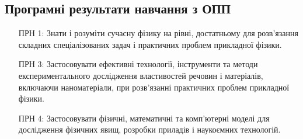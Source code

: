 \documentclass{Syllabus}
\begin{document}
\subsection*{Програмні результати навчання з ОПП}

\begin{enumerate}
	\item [ПРН 1:] Знати і розуміти сучасну фізику на рівні, достатньому для розв’язання складних спеціалізованих задач і практичних проблем прикладної фізики.
	\item [ПРН 3:] Застосовувати ефективні технології, інструменти та методи експериментального дослідження властивостей речовин і матеріалів, включаючи наноматеріали, при розв’язанні практичних проблем прикладної фізики.
	\item [ПРН 4:] Застосовувати фізичні, математичні та комп'ютерні моделі для дослідження фізичних явищ, розробки приладів і наукоємних технологій.

\end{enumerate}
\end{document}
